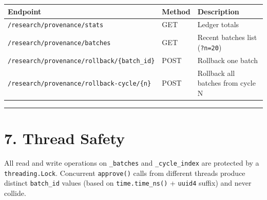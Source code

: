\begin{table}[h]
\small\centering
\begin{tabular}{lll}
\toprule
Endpoint & Method & Description \\
\midrule
\texttt{/research/provenance/stats} & GET & Ledger totals \\
\texttt{/research/provenance/batches} & GET & Recent batches list (\texttt{?n=20}) \\
\texttt{/research/provenance/rollback/\{batch\_id\}} & POST & Rollback one batch \\
\texttt{/research/provenance/rollback-cycle/\{n\}} & POST & Rollback all batches from cycle N \\
\bottomrule
\end{tabular}
\end{table}


\medskip\noindent\rule{\linewidth}{0.4pt}\medskip

\section*{7. Thread Safety}

All read and write operations on \texttt{\_batches} and \texttt{\_cycle\_index} are protected by a \texttt{threading.Lock}. Concurrent \texttt{approve()} calls from different threads produce distinct \texttt{batch\_id} values (based on \texttt{time.time\_ns()} + \texttt{uuid4} suffix) and never collide.
